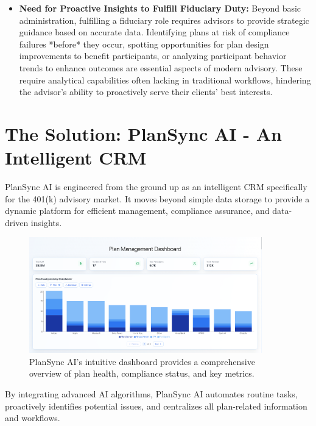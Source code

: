 \documentclass[11pt]{article} %
\begin{document}
\begin{itemize}[leftmargin=*]
    \item \textbf{Need for Proactive Insights to Fulfill Fiduciary Duty:} Beyond basic administration, fulfilling a fiduciary role requires advisors to provide strategic guidance based on accurate data. Identifying plans at risk of compliance failures *before* they occur, spotting opportunities for plan design improvements to benefit participants, or analyzing participant behavior trends to enhance outcomes are essential aspects of modern advisory. These require analytical capabilities often lacking in traditional workflows, hindering the advisor's ability to proactively serve their clients' best interests.
\end{itemize}

\section{The Solution: PlanSync AI - An Intelligent CRM}
PlanSync AI is engineered from the ground up as an intelligent CRM specifically for the 401(k) advisory market. It moves beyond simple data storage to provide a dynamic platform for efficient management, compliance assurance, and data-driven insights.

\begin{figure}[htbp]
    \centering
    \includegraphics[width=0.9\textwidth]{dashboard.png}
    \caption{PlanSync AI's intuitive dashboard provides a comprehensive overview of plan health, compliance status, and key metrics.}
    \label{fig:dashboard}
\end{figure}

By integrating advanced AI algorithms, PlanSync AI automates routine tasks, proactively identifies potential issues, and centralizes all plan-related information and workflows.
\end{document}
